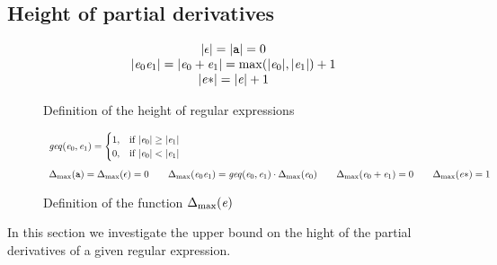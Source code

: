 
\subsection{Height of partial derivatives}\label{sec:height}
\begin{figure}
 $$
  \begin{array}{c}
   {\mid}{\ensuremath{\mathtt {\epsilon}}}{\mid}={\mid}{\mathtt {a}}{\mid}=0                                                              \\
   {\mid}{\mathit {e}_0\mathit {e}_1}{\mid}={\mid}{\mathit {e}_0\mathbin{+}\mathit {e}_1}{\mid}=\max({\mid}{\mathit {e}_0}{\mid},{\mid}{\mathit {e}_1}{\mid})+1 \\
   {\mid}{{\mathit {e}}*}{\mid}={\mid}{\mathit {e}}{\mid}+1
  \end{array}
 $$
 \caption{Definition of the height of regular expressions}
 \label{fig:height}
\end{figure}

\begin{figure}
 $$
  \begin{array}{l}
   \mathit{geq}({\mathit {e}_0},{\mathit {e}_1})=
   \begin{cases}
    1, & \text{if } {\mid}{\ensuremath{\mathit {e}}_0}{\mid} \geq {\mid}{\ensuremath{\mathit {e}}_1}{\mid} \\
    0, & \text{if } {\mid}{\ensuremath{\mathit {e}}_0}{\mid} < {\mid}{\mathit {e}_1}{\mid}
   \end{cases} \\[4ex]
   {\Delta_{\max}}({\mathtt {a}})={\Delta_{\max}}({\mathtt {\epsilon}})=0                                      \qquad
   {\Delta_{\max}}({\mathit {e}_0\mathit {e}_1})=\mathit{geq}({\mathit {e}_0},{\mathit {e}_1})\cdot{\Delta_{\max}}({\mathit {e}_0}) \qquad
   {\Delta_{\max}}({\mathit {e}_0\mathbin{+}\mathit {e}_1})=0                                         \qquad
   {\Delta_{\max}}({{\mathit {e}}*})=1
  \end{array}
 $$
 \caption{Definition of the function ${\Delta_{\max}}({\mathit {e}})$}
 \label{fig:incFun}
\end{figure}

In this section we investigate the upper bound on the hight of the partial derivatives of a given regular expression.


